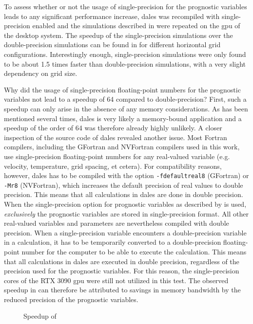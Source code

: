 To assess whether or not the usage of single-precision for the prognostic variables leads to any significant performance increase, \acrshort{dales} was recompiled with single-precision enabled and the simulations described in  were repeated on the \acrshort{gpu} of the desktop system. The speedup of the single-precision simulations over the double-precision simulations can be found in  for different horizontal grid configurations. Interestingly enough, single-precision simulations were only found to be about 1.5 times faster than double-precision simulations, with a very slight dependency on grid size.

Why did the usage of single-precision floating-point numbers for the prognostic variables not lead to a speedup of 64 compared to double-precision? First, such a speedup can only arise in the absence of any memory considerations. As has been mentioned several times, \acrshort{dales} is very likely a memory-bound application and a speedup of the order of 64 was therefore already highly unlikely. A closer inspection of the source code of \acrshort{dales} revealed another issue. Most Fortran compilers, including the GFortran and NVFortran compilers used in this work, use single-precision floating-point numbers for any real-valued variable (e.g. velocity, temperature, grid spacing, et cetera). For compatibility reasons, however, \acrshort{dales} has to be compiled with the option \texttt{-fdefaultreal8} (GFortran) or \texttt{-Mr8} (NVFortran), which increases the default precision of real values to double precision. This means that all calculations in \acrshort{dales} are done in double precision. When the single-precision option for prognostic variables as described by \citet{janssonCloudBotanyShallow2023} is used, \emph{exclusively} the prognostic variables are stored in single-precision format. All other real-valued variables and parameters are nevertheless compiled with double precision. When a single-precision variable encounters a double-precision variable in a calculation, it has to be temporarily converted to a double-precision floating-point number for the computer to be able to execute the calculation. This means that all calculations in \acrshort{dales} are executed in double precision, regardless of the precision used for the prognostic variables. For this reason, the single-precision cores of the RTX 3090 \acrshort{gpu} were still not utilized in this test. The observed speedup in  can therefore be attributed to savings in memory bandwidth by the reduced precision of the prognostic variables.

\begin{figure}[h!]
    \centering
    
    \caption{Speedup of }
    \label{fig:single_vs_double_precision}
\end{figure}
